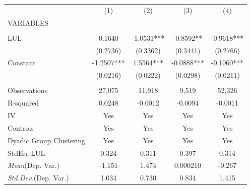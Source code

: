 \documentclass[]{article}
\begin{document}
\begin{tabular}{lcccc} \hline
 & (1) & (2) & (3) & (4) \\
VARIABLES &  &  &  &  \\ \hline
 &  &  &  &  \\
LUL & 0.1640 & -1.0531*** & -0.8592** & -0.9618*** \\
 & (0.2736) & (0.3362) & (0.3441) & (0.2766) \\
Constant & -1.2507*** & 1.5564*** & -0.0888*** & -0.1060*** \\
 & (0.0216) & (0.0222) & (0.0298) & (0.0211) \\
 &  &  &  &  \\
Observations & 27,075 & 11,918 & 9,519 & 52,326 \\
R-squared & 0.0248 & -0.0012 & -0.0094 & -0.0011 \\
IV & Yes & Yes & Yes & Yes \\
Controls & Yes & Yes & Yes & Yes \\
Dyadic Group Clustering & Yes & Yes & Yes & Yes \\
StdErr LUL & 0.324 & 0.311 & 0.397 & 0.314 \\
\textit{Mean}(Dep. Var.) & -1.151 & 1.474 & 0.000210 & -0.267 \\
 \textit{Std.Dev.}(Dep. Var.) & 1.034 & 0.730 & 0.834 & 1.415 \\ \hline
\end{tabular}
\end{document}
